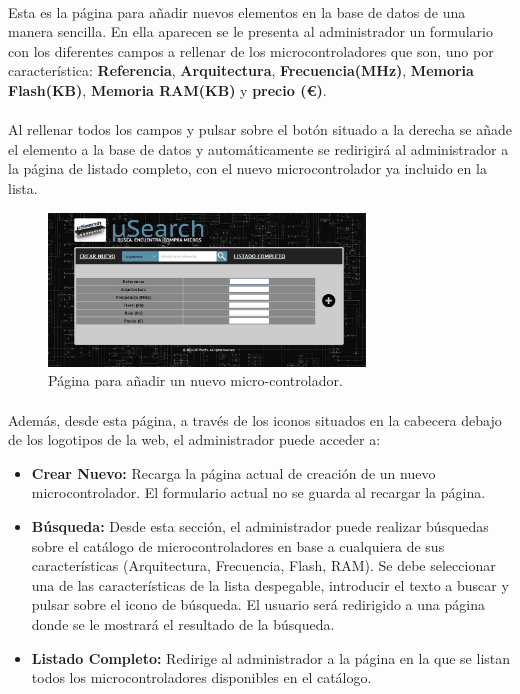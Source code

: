 \paragraph{} Esta es la página para añadir nuevos elementos en la base de datos de una manera sencilla. En ella aparecen se le presenta al administrador un formulario con los diferentes campos a rellenar de los microcontroladores que son, uno por característica: \textbf{Referencia}, \textbf{Arquitectura}, \textbf{Frecuencia(MHz)}, \textbf{Memoria Flash(KB)}, \textbf{Memoria RAM(KB)} y \textbf{precio (\euro)}.

\paragraph{} Al rellenar todos los campos y pulsar sobre el botón situado a la derecha se añade el elemento a la base de datos y automáticamente se redirigirá al administrador a la página de listado completo, con el nuevo microcontrolador ya incluido en la lista.

\begin{figure}[h!]
	\centering
	\includegraphics[width=0.75\textwidth]{img/anyadir}
	\caption{Página para añadir un nuevo micro-controlador.}
	\label{fig:anyadir}
\end{figure}

\paragraph{}Además, desde esta página, a través de los iconos situados en la cabecera debajo de los logotipos de la web, el administrador puede acceder a:

\begin{itemize}
	
	\item \textbf{Crear Nuevo:} Recarga la página actual de creación de un nuevo microcontrolador. El formulario actual no se guarda al recargar la página.

	\item \textbf{Búsqueda:} Desde esta sección, el administrador puede realizar búsquedas sobre el catálogo de microcontroladores en base a cualquiera de sus características (Arquitectura, Frecuencia, Flash, RAM). Se debe seleccionar una de las características de la lista despegable, introducir el texto a buscar y pulsar sobre el icono de búsqueda.
	El usuario será redirigido a una página donde se le mostrará el resultado de la búsqueda.
			
	\item \textbf{Listado Completo:} Redirige al administrador a la página en la que se listan todos los microcontroladores disponibles en el catálogo.
\end{itemize}